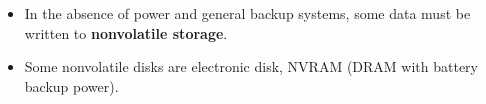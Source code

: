 \documentclass[10pt]{article}
\begin{document}
\begin{enumerate}
\begin{itemize}
		\bigbreak
		\bigbreak

		\item In the absence of power and general backup systems, some data must be written to \textbf{nonvolatile storage}.
		\item Some nonvolatile disks are electronic disk, NVRAM (DRAM with battery backup power).
	\end{itemize}

\end{enumerate}
\end{document}
